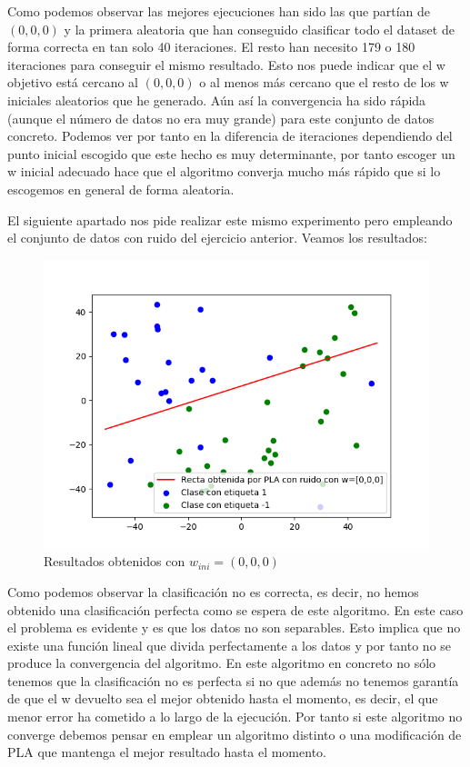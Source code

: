 \documentclass[12pt,a4paper]{article}
\begin{document}
Como podemos observar las mejores ejecuciones han sido las que partían de $(0,0,0)$ y la primera aleatoria que han conseguido clasificar todo el dataset de forma correcta en tan solo 40 iteraciones. El resto han necesito 179 o 180 iteraciones para conseguir el mismo resultado. Esto nos puede indicar que el w objetivo está cercano al $(0,0,0)$ o al menos más cercano que el resto de los w iniciales aleatorios que he generado. Aún así la convergencia ha sido rápida (aunque el número de datos no era muy grande) para este conjunto de datos concreto. Podemos ver por tanto en la diferencia de iteraciones dependiendo del punto inicial escogido que este hecho es muy determinante, por tanto escoger un w inicial adecuado hace que el algoritmo converja mucho más rápido que si lo escogemos en general de forma aleatoria.

El siguiente apartado nos pide realizar este mismo experimento pero empleando el conjunto de datos con ruido del ejercicio anterior. Veamos los resultados:

\begin{figure}[H]
	\centering
	\includegraphics[scale=0.8]{./Imagenes/ej2-12.png}
	\caption{Resultados obtenidos con $w_{ini}=(0,0,0)$}
\end{figure}

Como podemos observar la clasificación no es correcta, es decir, no hemos obtenido una clasificación perfecta como se espera de este algoritmo. En este caso el problema es evidente y es que los datos no son separables. Esto implica que no existe una función lineal que divida perfectamente a los datos y por tanto no se produce la convergencia del algoritmo. En este algoritmo en concreto no sólo tenemos que la clasificación no es perfecta si no que además no tenemos garantía de que el w devuelto sea el mejor obtenido hasta el momento, es decir, el que menor error ha cometido a lo largo de la ejecución. Por tanto si este algoritmo no converge debemos pensar en emplear un algoritmo distinto o una modificación de PLA que mantenga el mejor resultado hasta el momento.
\end{document}
